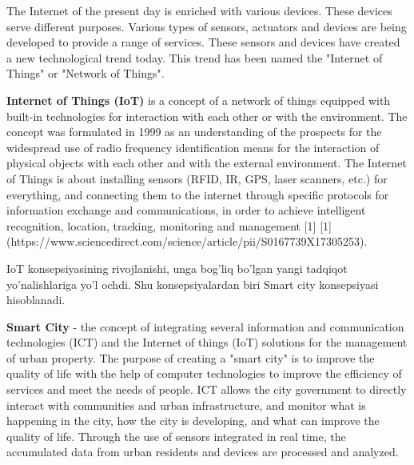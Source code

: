 
The Internet of the present day is enriched with various devices. These devices serve different purposes. Various types of sensors, actuators and devices are being developed to provide a range of services. These sensors and devices have created a new technological trend today. This trend has been named the "Internet of Things" or "Network of Things". 

\textbf{Internet of Things (IoT)} is a concept of a network of things equipped with built-in technologies for interaction with each other or with the environment. The concept was formulated in 1999 as an understanding of the prospects for the widespread use of radio frequency identification means for the interaction of physical objects with each other and with the external environment. The Internet of Things is about installing sensors (RFID, IR, GPS, laser scanners, etc.) for everything, and connecting them to the internet through specific protocols for information exchange and communications, in order to achieve intelligent recognition, location, tracking, monitoring and management [1]
[1] (https://www.sciencedirect.com/science/article/pii/S0167739X17305253). 

IoT konsepsiyasining rivojlanishi, unga bog’liq bo’lgan yangi tadqiqot yo’nalishlariga yo’l ochdi. Shu konsepsiyalardan biri Smart city konsepsiyasi hisoblanadi. 

\textbf{Smart City} - the concept of integrating several information and communication technologies (ICT) and the Internet of things (IoT) solutions for the management of urban property. The purpose of creating a "smart city" is to improve the quality of life with the help of computer technologies to improve the efficiency of services and meet the needs of people. ICT allows the city government to directly interact with communities and urban infrastructure, and monitor what is happening in the city, how the city is developing, and what can improve the quality of life. Through the use of sensors integrated in real time, the accumulated data from urban residents and devices are processed and analyzed. 
